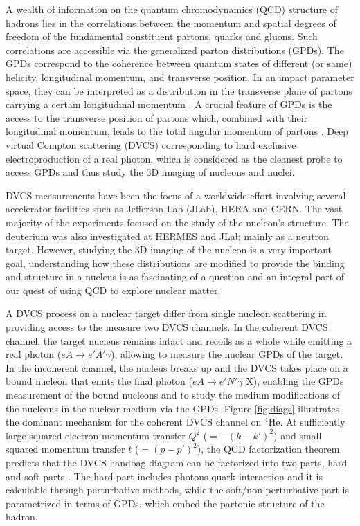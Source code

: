 \documentclass[nofootinbib,twocolumn,showpacs,prl,superscriptaddress,secnumarabic,amssymb,nobibnotes,aps,floatfix]{revtex4}
\begin{document}
A wealth of information on the quantum chromodynamics (QCD) structure of 
hadrons lies in the correlations between the momentum and spatial degrees of 
freedom of the fundamental constituent partons, quarks and gluons. Such 
correlations are accessible via the generalized parton distributions (GPDs).  
The GPDs correspond to the coherence between quantum states of different (or 
same) helicity, longitudinal momentum, and transverse position. In an impact 
parameter space, they can be interpreted as a distribution in the transverse 
plane of partons carrying a certain longitudinal momentum 
\cite{Burkardt:2000za,Diehl:2002he,Belitsky:2002ep}. A crucial feature of GPDs 
is the access to the transverse position of partons which, combined with their 
longitudinal momentum, leads to the total angular momentum of partons 
\cite{Burkardt:2005hp}. Deep virtual Compton scattering (DVCS) corresponding to 
hard exclusive electroproduction of a real photon, which is considered as the 
cleanest probe to access GPDs and thus study the 3D imaging of nucleons and 
nuclei.

DVCS measurements have been the focus of a worldwide effort 
\cite{Stepanyan:2001sm,Airapetian,Chekanov:2003ya,Aktas:2005ty,Chen:2006na,Munoz 
Camacho:2006hx,Girod:2007aa,Gavalian:2009,Seder:2015,Pisano:2015,Jo:2015ema} 
involving several accelerator facilities such as Jefferson Lab (JLab), HERA and  
CERN. The vast majority of the experiments focused on the study of the 
nucleon's structure. The deuterium was also investigated at HERMES and JLab 
\cite{Mazouz:2007aa} mainly as a neutron target. However, studying the 3D 
imaging of the nucleon is a very important goal, understanding how these 
distributions are modified to provide the binding and structure in a nucleus is 
as fascinating of a question and an integral part of our quest of using QCD to 
explore nuclear matter. 

A DVCS process on a nuclear target differ from single nucleon scattering in 
providing access to the measure two DVCS channels. In the coherent DVCS 
channel, the target nucleus remains intact and recoils as a whole while 
emitting a real photon ($eA \rightarrow e' A' \gamma$), allowing to measure the 
nuclear GPDs of the target. In the incoherent channel, the nucleus breaks up 
and the DVCS takes place on a bound nucleon that emits the final photon ($eA 
\rightarrow e' N' \gamma$ X), enabling the GPDs measurement of the bound 
nucleons and to study the medium modifications of the nucleons in the nuclear 
medium via the GPDs.  Figure \ref{fig:diags} illustrates the dominant mechanism 
for the coherent DVCS channel on $^4$He. At sufficiently large squared electron 
momentum transfer $Q^2$ ($= -(k-k')^{2}$) and small squared momentum transfer 
$t$ ($= (p-p')^{2}$), the QCD factorization theorem predicts that the DVCS 
handbag diagram can be factorized into two parts, hard and soft parts 
\cite{Freund_Collins,Ji_Osborne}. The hard part includes photons-quark 
interaction and it is calculable through perturbative methods, while the 
soft/non-perturbative part is parametrized in terms of GPDs, which embed the 
partonic structure of the hadron.  
\end{document}
